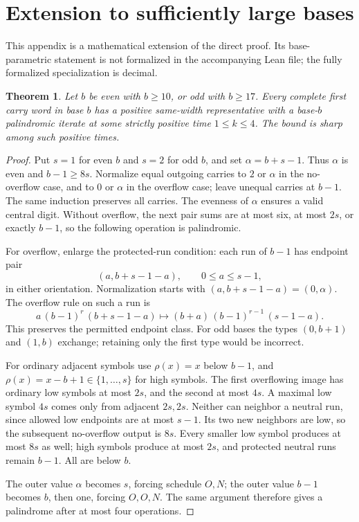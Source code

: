 \documentclass[11pt]{article}
\newtheorem{theorem}{Theorem}
\begin{document}
\clearpage
\section{Extension to sufficiently large bases}
\label{app:bases}
This appendix is a mathematical extension of the direct proof. Its
base-parametric statement is not formalized in the accompanying Lean file;
the fully formalized specialization is decimal.

\begin{theorem}\label{thm:bases}
Let $b$ be even with $b\geq10$, or odd with $b\geq17$. Every complete
first carry word in base $b$ has a positive same-width representative
with a base-$b$ palindromic iterate at some strictly positive time
$1\leq k\leq4$. The bound is sharp among such positive times.
\end{theorem}
\begin{proof}
Put $s=1$ for even $b$ and $s=2$ for odd $b$, and set
$\alpha=b+s-1$. Thus $\alpha$ is even and $b-1\geq8s$.
Normalize equal outgoing carries to $2$ or $\alpha$ in the no-overflow
case, and to $0$ or $\alpha$ in the overflow case; leave unequal carries
at $b-1$. The same induction preserves all carries. The evenness of
$\alpha$ ensures a valid central digit. Without overflow, the next pair
sums are at most six, at most $2s$, or exactly $b-1$, so the following
operation is palindromic.

For overflow, enlarge the protected-run condition: each run of $b-1$ has
endpoint pair
\[
 (a,b+s-1-a),\qquad 0\leq a\leq s-1,
\]
in either orientation. Normalization starts with $(a,b+s-1-a)=(0,\alpha)$.
The overflow rule on such a run is
\[
 a\,(b-1)^r\,(b+s-1-a)
 \longmapsto (b+a)\,(b-1)^{r-1}\,(s-1-a).
\]
This preserves the permitted endpoint class. For odd bases the types
$(0,b+1)$ and $(1,b)$ exchange; retaining only the first type would be
incorrect.

For ordinary adjacent symbols use $\rho(x)=x$ below $b-1$, and
$\rho(x)=x-b+1\in\{1,\ldots,s\}$ for high symbols. The first overflowing
image has ordinary low symbols at most $2s$, and the second at most $4s$.
A maximal low symbol $4s$ comes only from adjacent $2s,2s$. Neither can
neighbor a neutral run, since allowed low endpoints are at most $s-1$.
Its two new neighbors are low, so the subsequent no-overflow output is
$8s$. Every smaller low symbol produces at most $8s$ as well; high symbols
produce at most $2s$, and protected neutral runs remain $b-1$.
All are below $b$.

The outer value $\alpha$ becomes $s$, forcing schedule $O,N$; the outer
value $b-1$ becomes $b$, then one, forcing $O,O,N$. The same argument
therefore gives a palindrome after at most four operations.


\end{proof}
\end{document}
